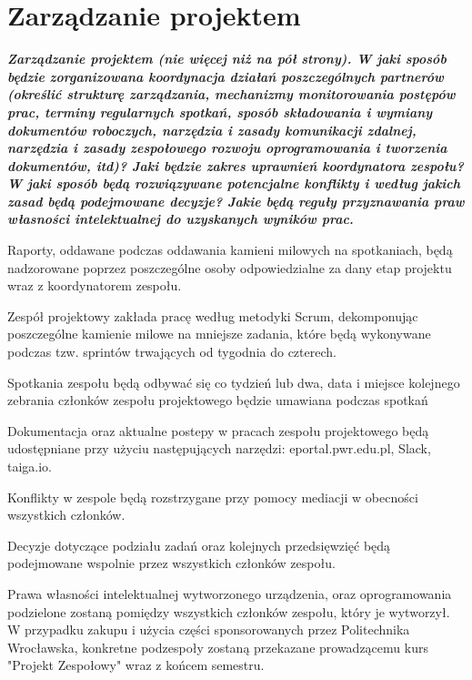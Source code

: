 \documentclass[10pt, a4paper]{article}
\begin{document}
\section{Zarządzanie projektem}
\textit{\textbf{Zarządzanie projektem (nie więcej niż na pół strony). W jaki sposób będzie zorganizowana koordynacja działań poszczególnych partnerów (określić strukturę zarządzania, mechanizmy monitorowania postępów prac, terminy regularnych spotkań, sposób składowania i wymiany dokumentów roboczych, narzędzia i zasady komunikacji zdalnej, narzędzia i zasady zespołowego rozwoju oprogramowania i tworzenia dokumentów, itd)? Jaki będzie zakres uprawnień koordynatora zespołu? W jaki sposób będą rozwiązywane potencjalne konflikty i według jakich zasad będą podejmowane decyzje? Jakie będą reguły przyznawania praw własności intelektualnej do uzyskanych wyników prac.}}

\begin{description}[font=$\bullet$~\normalfont]
\item Raporty, oddawane podczas oddawania kamieni milowych na spotkaniach, będą nadzorowane poprzez poszczególne osoby odpowiedzialne za dany etap projektu wraz z koordynatorem zespołu.
\item Zespół projektowy zakłada pracę według metodyki Scrum, dekomponując poszczególne kamienie milowe na mniejsze zadania, które będą wykonywane podczas tzw. sprintów trwających od tygodnia do czterech.
\item Spotkania zespołu będą odbywać się co tydzień lub dwa, data i miejsce kolejnego zebrania członków zespołu projektowego będzie umawiana podczas spotkań
\item Dokumentacja oraz aktualne postepy w pracach zespołu projektowego będą udostępniane przy użyciu następujących narzędzi: eportal.pwr.edu.pl, Slack, taiga.io.
\item Konflikty w zespole będą rozstrzygane przy pomocy mediacji w obecności wszystkich członków. \item Decyzje dotyczące podziału zadań oraz kolejnych przedsięwzięć będą podejmowane wspolnie przez wszystkich członków zespołu.
\item Prawa własności intelektualnej wytworzonego urządzenia, oraz oprogramowania podzielone zostaną pomiędzy wszystkich członków zespołu, który je wytworzył. W przypadku zakupu i użycia części sponsorowanych przez Politechnika Wrocławska, konkretne podzespoły zostaną przekazane prowadzącemu kurs "Projekt Zespołowy" wraz z końcem semestru.
\end{description}
\end{document}
